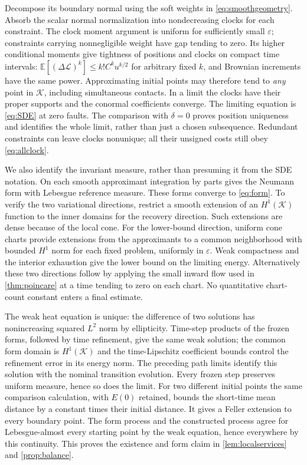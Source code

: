 \documentclass[11pt]{article}
\numberwithin{equation}{section}
\theoremstyle{definition}
\theoremstyle{remark}\newtheorem{remark}[theorem]{Remark}
\newcommand{\E}{\mathbb E}
\newcommand{\K}{\mathcal K}
\begin{document}
Decompose its boundary normal using the soft weights in
\eqref{eq:smoothgeometry}. Absorb the scalar normal normalization into
nondecreasing clocks for each constraint. The clock moment argument is
uniform for sufficiently small $\varepsilon$; constraints carrying
nonnegligible weight have gap tending to zero. Its higher conditional
moments give tightness of positions and clocks on compact time intervals:
$\E[(\Delta\mathcal L)^k]\le k!C^ku^{k/2}$ for arbitrary fixed $k$,
and Brownian increments have the same power. Approximating initial points
may therefore tend to \emph{any} point in $\K$, including simultaneous
contacts. In a limit the clocks have their proper supports and the
conormal coefficients converge. The limiting equation is \eqref{eq:SDE}
at zero faults. The comparison with $\delta=0$ proves position uniqueness
and identifies the whole limit, rather than just a chosen subsequence.
Redundant constraints can leave clocks nonunique; all their unsigned costs
still obey \eqref{eq:allclock}.

We also identify the invariant measure, rather than presuming it from the
SDE notation. On each smooth approximant integration by parts gives the
Neumann form with Lebesgue reference measure. These forms converge to
\eqref{eq:form}. To verify the two variational directions, restrict a
smooth extension of an $H^1(\K)$ function to the inner domains for the
recovery direction. Such extensions are dense because of the local cone.
For the lower-bound direction, uniform cone charts provide extensions
from the approximants to a common neighborhood with bounded $H^1$ norm
for each fixed problem, uniformly in $\varepsilon$. Weak compactness and
the interior exhaustion give the lower bound on the limiting energy.
Alternatively these two directions follow by applying the small inward
flow used in \cref{thm:poincare} at a time tending to zero on each chart.
No quantitative chart-count constant enters a final estimate.

The weak heat equation is unique: the difference of two solutions has
nonincreasing squared $L^2$ norm by ellipticity. Time-step products of the
frozen forms, followed by time refinement, give the same weak solution;
the common form domain is $H^1(\K)$ and the time-Lipschitz coefficient
bounds control the refinement error in its energy norm. The preceding
path limits identify this solution with the nominal transition evolution.
Every frozen step preserves uniform measure, hence so does the limit.
For two different initial points the same comparison calculation, with
$E(0)$ retained, bounds the short-time mean distance by a constant times
their initial distance. It gives a Feller extension to every boundary
point. The form process and the constructed process agree for
Lebesgue-almost every starting point by the weak equation, hence everywhere
by this continuity. This proves the existence and form claim in
\cref{lem:localservices} and \cref{prop:balance}.
\end{document}
